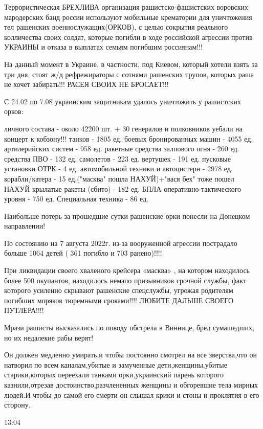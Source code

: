 {%
Террористическая БРЕХЛИВА организация рашистско-фашистских воровских
мародерских банд россии используют мобильные крематории для уничтожения тел
рашенских военнослужащих(ОРКОВ), с целью сокрытия реального колличества своих
солдат, которые погибли в ходе российской агрессии против УКРАИНЫ и отказа в
выплатах семьям погибшим россиянам!!!

На данный момент в Украине, в частности, под Киевом, который хотели взять за
три дня, стоят ж/д рефрежираторы с сотнями рашенских трупов, которых раша не
хочет забирать!!! РАСЕЯ СВОИХ НЕ БРОСАЕТ!!! 

С 24.02 по 7.08 украинским защитникам удалось уничтожить у рашистских орков:

личного состава - около 42200 шт. + 30 генералов и полковников уебали на концерт к кобзону!!!
танков - 1805 ед. 
боевых бронированных машин - 4055 ед.
артилерийских систем - 958 ед.
ракетные средства залпового огня - 260 ед.
средства ПВО - 132 ед.
самолетов - 223 ед.
вертушек - 191 ед.
пусковые установки ОТРК - 4 ед.
автомобильной техники и автоцистерн - 2978 ед.
корабли/катера - 15 ед.("масква" пошла НАХУЙ)+"вася бех" тоже пошел НАХУЙ
крылатые ракеты (сбито) - 182 ед.
БПЛА оперативно-тактического уровня - 750 ед.
Специальная техника - 86 ед.

Наибольше потерь за прошедшие сутки рашенские орки понесли на Донецком направлении! 

По состоянию на 7 августа 2022г. из-за вооруженной агрессии пострадало больше
1064 детей ( 361 погибло и 703 ранено)!!!!

При ликвидации своего хваленого крейсера «масква» , на котором находилось более
500 окупантов, находилось немало призывников срочной службы, факт которого
усиленно скрывают рашенские спецслужбы, угрожая родителям погибших моряков
тюремными сроками!!!! ЛЮБИТЕ ДАЛЬШЕ СВОЕГО ПУТЛЕРА!!!!

Мрази рашисты высказались по поводу обстрела в Виннице, бред сумашедших, но их
недалекие рабы верят!

Он должен медленно умирать,и чтобы постоянно смотрел на все зверства,что он
натворил по всем  каналам,убитые и замученные дети,женщины,убитые
старики,которых переехали танками орки,украинский парень которого
казнили,отрезав достоинство,разчлененных женщины и обгоревшие тела мирных
людей.И чтобы до самой его смерти он слышал крики и стоны и проклятия в его
сторону.

13:04

}
